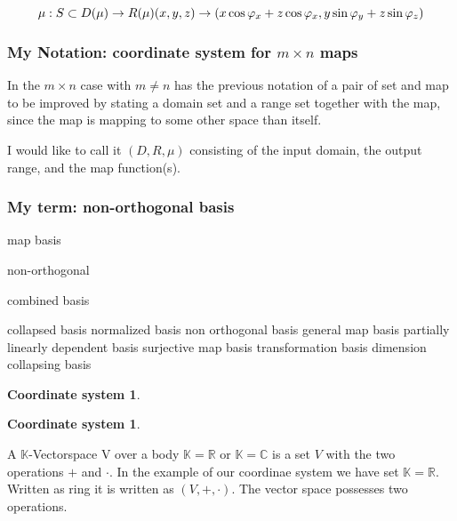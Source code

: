 \documentclass[a4paper]{article}
\begin{document}
\begin{displaymath}
	\mu : S \subset D(\mu) \rightarrow R(\mu)\\
	(x,y,z) \rightarrow (x\cos \varphi_x + z\cos\varphi_x, y\sin\varphi_y + z\sin \varphi_z)
\end{displaymath}



\subsubsection{My Notation: coordinate system for $m \times n$ maps}

In the $m \times n$ case with $m \neq n$ has the previous notation of a pair of set and map to be improved by
stating a domain set and a range set together with the map, since the map is mapping to some other space than itself.


I would like to call it $(D,R,\mu)$ consisting of the input domain, the output range, and the map function(s).


\subsubsection{My term: non-orthogonal basis}

\begin{definition}
	\item[map basis]
	\item[non-orthogonal]
	\item[]
\end{definition}


combined basis


collapsed basis
normalized basis
non orthogonal basis
general map basis
partially linearly dependent basis
surjective map basis
transformation basis
dimension collapsing basis



\newtheorem{coordsys}{Coordinate system}
\begin{coordsys}
\end{coordsys}

\newtheorem{axis}{Coordinate system}
\begin{axis}
\end{axis}





A $\mathbb{K}$-Vectorspace V over a body $\mathbb{K} = \mathbb{R}$ or $\mathbb{K} = \mathbb{C}$ is a set $V$ with the two operations $+$ and $\cdot$. In the example of our coordinae system we have set $\mathbb{K} = \mathbb{R}$. Written as ring it is written as $(V, +, \cdot)$. The vector space possesses two operations.
\end{document}
